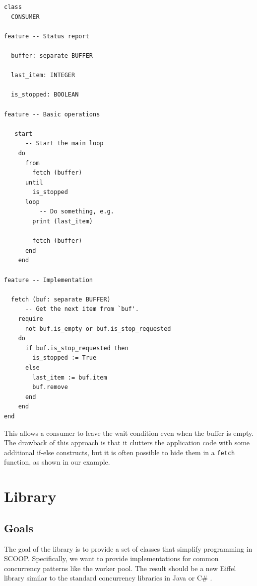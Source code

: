 \documentclass[a4paper,10pt,titlepage]{article}
\begin{document}
\begin{lstlisting}[language=OOSC2Eiffel, captionpos=b, caption={Breaking out of a wait condition.}]
class
  CONSUMER

feature -- Status report

  buffer: separate BUFFER
  
  last_item: INTEGER
  
  is_stopped: BOOLEAN
  
feature -- Basic operations
  
   start
      -- Start the main loop
    do
      from
        fetch (buffer)
      until 
        is_stopped
      loop
          -- Do something, e.g.
        print (last_item)

        fetch (buffer)
      end
    end
  
feature -- Implementation

  fetch (buf: separate BUFFER)
      -- Get the next item from `buf'.
    require
      not buf.is_empty or buf.is_stop_requested
    do
      if buf.is_stop_requested then
        is_stopped := True
      else
        last_item := buf.item
        buf.remove
      end
    end
end
\end{lstlisting}

This allows a consumer to leave the wait condition even when the buffer is empty.
The drawback of this approach is that it clutters the application code with some additional if-else constructs, 
but it is often possible to hide them in a \lstinline!fetch! function, as shown in our example.

\section {Library}
\label{sec:library}

 
\subsection{Goals}
\label{sec:goals}

The goal of the library is to provide a set of classes that simplify programming in SCOOP. 
Specifically, we want to provide implementations for common concurrency patterns like the worker pool.
The result should be a new Eiffel library similar to the standard concurrency libraries in Java \cite{web:java-concurrency} or C\# \cite{web:ms-tpl}.
\end{document}
